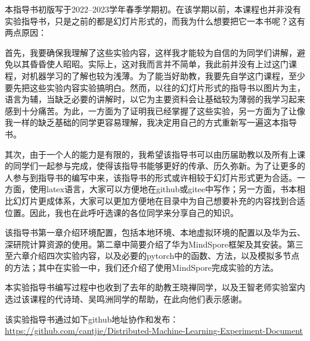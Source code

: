 


\hspace{2em}本指导书初版写于2022--2023学年春季学期初。在该学期以前，本课程也并非没有实验指导书，只是之前的都是幻灯片形式的，而我为什么想要把它一本书呢？这有两点原因：

\hspace{2em}首先，我要确保我理解了这些实验内容，这样我才能较为自信的为同学们讲解，避免以其昏昏使人昭昭。实际上，这对我而言并不简单，我此前并没有上过这门课程，对机器学习的了解也较为浅薄。为了能当好助教，我要先自学这门课程，至少要先把这些实验内容实验搞明白。然而，以往的幻灯片形式的指导书以图片为主，语言为辅，当缺乏必要的讲解时，以它为主要资料会让基础较为薄弱的我学习起来感到十分痛苦。为此，一方面为了证明我已经掌握了这些实验，另一方面为了让像我一样的缺乏基础的同学更容易理解，我决定用自己的方式重新写一遍这本指导书。

\hspace{2em}其次，由于一个人的能力是有限的，我希望该指导书可以由历届助教以及所有上课的同学们一起参与完成，使得该指导书能够更好的传承、历久弥新。为了让更多的人参与到指导书的编写中来，该指导书的形式或许相较于幻灯片形式更为合适。一方面，使用latex语言，大家可以方便地在github或gitee中写作；另一方面，书本相比幻灯片更成体系，大家可以更加方便地在目录中为自己想要补充的内容找到合适位置。因此，我也在此呼吁选课的各位同学来分享自己的知识。


\hspace{2em}该指导书第一章介绍环境配置，包括本地环境、本地虚拟环境的配置以及华为云、深研院计算资源的使用。第二章中简要介绍了华为MindSpore框架及其安装。第三至六章介绍四次实验内容，以及必要的pytorch中的函数、方法，以及模拟多节点的方法；其中在实验一中，我们还介绍了使用MindSpore完成实验的方法。

\hspace{2em}本实验指导书编写过程中也收到了去年的助教王晓禅同学，以及王智老师实验室内选过该课程的代诗琦、吴鸣洲同学的帮助，在此向他们表示感谢。

\hspace{2em}该实验指导书通过如下github地址协作和发布：\url{https://github.com/cantjie/Distributed-Machine-Learning-Experiment-Document}

